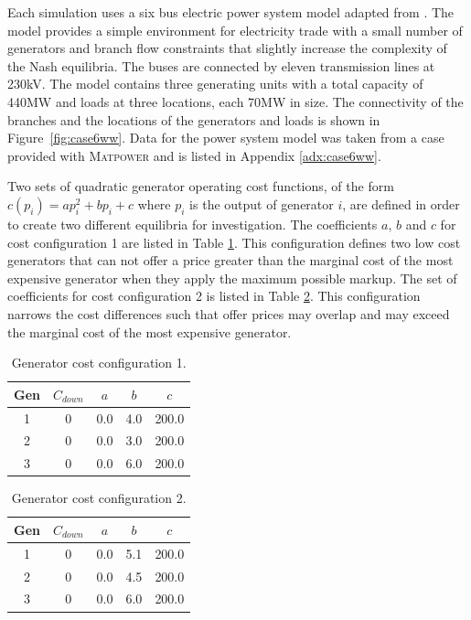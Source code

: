 Each simulation uses a six bus electric power system model adapted from
.  The model provides a simple
environment for electricity trade with a small number of generators and branch
flow constraints that slightly increase the complexity of the Nash equilibria.
The buses are connected by eleven transmission lines at 230kV. The model
contains three generating units with a total capacity of 440MW and loads at
three locations, each 70MW in size. The connectivity of the branches and the
locations of the generators and loads is shown in Figure~\ref{fig:case6ww}. Data
for the power system model was taken from a case provided with \textsc{Matpower}
and is listed in Appendix \ref{adx:case6ww}.

Two sets of quadratic generator operating cost functions, of the form
$c(p_i)=ap_i^2+bp_i+c$ where $p_i$ is the output of generator $i$, are defined
in order to create two different equilibria for investigation.  The coefficients
$a$, $b$ and $c$ for cost configuration 1 are listed in Table
\ref{tbl:case6ww_gencost1}.  This configuration defines two low cost
generators that can not offer a price greater than the marginal cost of the most
expensive generator when they apply the maximum possible markup. The set of
coefficients for cost configuration 2 is listed in Table
\ref{tbl:case6ww_gencost2}.  This configuration narrows the cost differences
such that offer prices may overlap and may exceed the marginal cost of the most
expensive generator.


\begin{table}
\begin{center}
\begin{tabular}{c|c|c|c|c}
\hline
Gen &$C_{down}$ &$a$ &$b$ &$c$ \\
\hline\hline
 1 &0 &0.0 &4.0 &200.0 \\
 2 &0 &0.0 &3.0 &200.0 \\
 3 &0 &0.0 &6.0 &200.0 \\
\hline
\end{tabular}
\caption{Generator cost configuration 1.}
\label{tbl:case6ww_gencost1}
\end{center}
\end{table}

\begin{table}
\begin{center}
\begin{tabular}{c|c|c|c|c}
\hline
Gen &$C_{down}$ &$a$ &$b$ &$c$ \\
\hline\hline
 1 &0 &0.0 &5.1 &200.0 \\
 2 &0 &0.0 &4.5 &200.0 \\
 3 &0 &0.0 &6.0 &200.0 \\
\hline
\end{tabular}
\caption{Generator cost configuration 2.}
\label{tbl:case6ww_gencost2}
\end{center}
\end{table}

